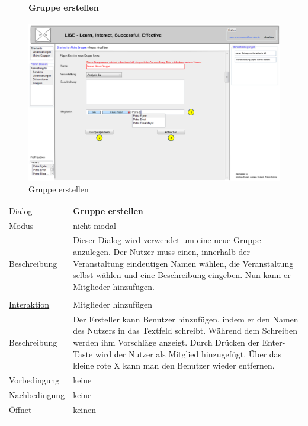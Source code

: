 \documentclass[12pt,a4paper]{article}
\begin{document}
{\begin{figure}[H]
	\centering
	\paragraph{Gruppe erstellen}
	\includegraphics[width=\textwidth]{Bilder/Mockups/GUI/GruppeErstellen.png}
	\caption{Gruppe erstellen}
	\label{GuiGruppeErstellen}
\end{figure}
\begin{tabular}{l p{12cm}}
	Dialog 	 & \textbf{Gruppe erstellen} \\ 
	Modus & nicht modal\\ 
	Beschreibung   	& Dieser Dialog wird verwendet um eine neue Gruppe anzulegen. Der Nutzer muss einen, innerhalb der Veranstaltung eindeutigen Namen wählen, die Veranstaltung selbst wählen und eine Beschreibung eingeben. Nun kann er Mitglieder hinzufügen. \\\\
	
	\underline{Interaktion} 	 & Mitglieder hinzufügen\\ 
	Beschreibung   	& Der Ersteller kann Benutzer hinzufügen, indem er den Namen des Nutzers in das Textfeld schreibt. Während dem Schreiben werden ihm Vorschläge anzeigt. Durch Drücken der Enter-Taste wird der Nutzer als Mitglied hinzugefügt. Über das kleine rote X kann man den Benutzer wieder entfernen.\\
	Vorbedingung	& keine \\
	Nachbedingung	& keine \\
	Öffnet			& keinen\\\\
\end{tabular}

}
\end{document}

